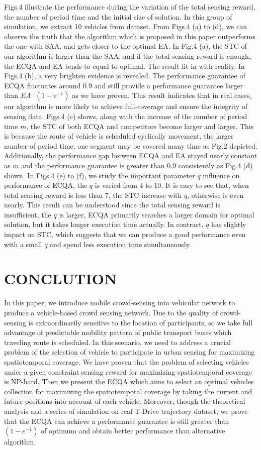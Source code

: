 \documentclass[journal]{IEEEtran}
\begin{document}
Figs.4 illustrate the performance during the variation of the total sensing reward, the number of period time and the initial size of solution. In this group of simulation, we extract 10 vehicles from dataset. From Figs.4 (a) to (d), we can observe the truth that the algorithm which is proposed in this paper outperforms the one with SAA, and gets closer to the optimal EA. In Fig.4 (a), the STC of our algorithm is larger than the SAA, and if the total sensing reward is enough, the ECQA and EA tends to equal to optimal. The result fit in with reality. In Figs.4 (b), a very brighten evidence is revealed. The performance guarantee of ECQA fluctuates around 0.9 and still provide a performance guarantee larger than $EA\cdot(1-e^{-1})$ as we have proven. This result indicates that in real cases, our algorithm is more likely to achieve full-coverage and ensure the integrity of sensing data. Figs.4 (c) shows, along with the increase of the number of period time $m$, the STC of both ECQA and competitors become larger and larger. This is because the route of vehicle is scheduled cyclically movement, the larger number of period time, one segment may be covered many time as Fig.2 depicted. Additionally, the performance gap between ECQA and EA stayed nearly constant as $m$ and the performance guarantee is greater than 0.9 consistently as Fig.4 (d) shown. In Figs.4 (e) to (f), we study the important parameter $q$ influence on performance of ECQA, the $q$ is varied from 4 to 10. It is easy to see that, when total sensing reward is less than 7, the STC increase with $q$, otherwise is even nearly. This result can be understood since the total sensing reward is insufficient, the $q$ is larger, ECQA primarily searches a larger domain for optimal solution, but it takes longer execution time actually. In contract, $q$ has slightly impact on STC, which suggests that we can produce a good performance even with a small $q$ and spend less execution time simultaneously. 
\section{CONCLUTION}
In this paper, we introduce mobile crowd-sensing into vehicular network to produce a vehicle-based crowd sensing network. Due to the quality of crowd-sensing is extraordinarily sensitive to the location of participants, so we take full advantage of predictable mobility pattern of public transport buses which traveling route is scheduled. In this scenario, we need to address a crucial problem of the selection of vehicle to participate in urban sensing for maximizing spatiotemporal coverage. We have proven that the problem of selecting vehicles under a given constraint sensing reward for maximizing spatiotemporal coverage is NP-hard. Then we present the ECQA which aims to select an optimal vehicles collection for maximizing the spatiotemporal coverage by taking the current and future positions into account of each vehicle. Moreover, though the theoretical analysis and a series of simulation on real T-Drive trajectory dataset, we prove that the ECQA can achieve a performance guarantee is still greater than $(1-e^{-1})$ of optimum and obtain better performance than alternative algorithm.
\end{document}

